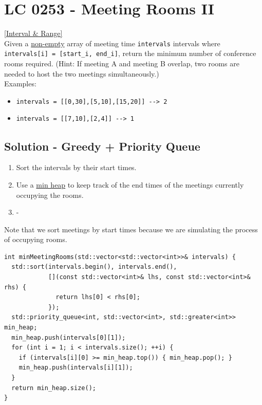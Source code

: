 \section{LC 0253 - Meeting Rooms II}\label{lc0253}
\hyperref[sec:interval_range]{[Interval \& Range]}\\

Given a \ul{non-empty} array of meeting time {\colorbox{CodeBackground}{\lstinline|intervals|}} intervals where {\colorbox{CodeBackground}{\lstinline|intervals[i] = [start_i, end_i]|}}, return the minimum number of conference rooms required. (Hint: If meeting A and meeting B overlap, two rooms are needed to host the two meetings simultaneously.) \\

Examples:
\begin{itemize}
\item {\colorbox{CodeBackground}{\lstinline|intervals = [[0,30],[5,10],[15,20]] --> 2|}}
\item {\colorbox{CodeBackground}{\lstinline|intervals = [[7,10],[2,4]] --> 1|}}
\end{itemize}

\subsection*{Solution - Greedy + Priority Queue}
\begin{enumerate}
\item Sort the intervals by their start times.
\item Use a \ul{min heap} to keep track of the end times of the meetings currently occupying the rooms.
\item {}
  \subitem {\color{magenta}{- If the new meeting starts after the top in the heap ends, we can use that room.}}
  \subitem - {\color{magenta}{If not, we need a new room.}}
\end{enumerate}
Note that we sort meetings by start times because we are simulating the process of occupying rooms.
\begin{lstlisting}
int minMeetingRooms(std::vector<std::vector<int>>& intervals) {
  std::sort(intervals.begin(), intervals.end(),
            [](const std::vector<int>& lhs, const std::vector<int>& rhs) {
              return lhs[0] < rhs[0];
            });
  std::priority_queue<int, std::vector<int>, std::greater<int>> min_heap;
  min_heap.push(intervals[0][1]);
  for (int i = 1; i < intervals.size(); ++i) {
    if (intervals[i][0] >= min_heap.top()) { min_heap.pop(); }
    min_heap.push(intervals[i][1]);
  }
  return min_heap.size();
}
\end{lstlisting}

